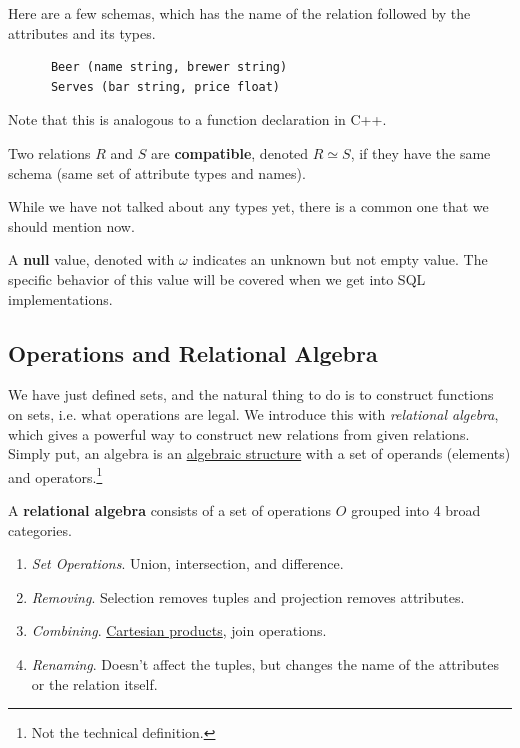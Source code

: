   \begin{example}[Schemas]
    \label{ex:schemas}
    Here are a few schemas, which has the name of the relation followed by the attributes and its types. 
    \begin{lstlisting}
      Beer (name string, brewer string)
      Serves (bar string, price float)
    \end{lstlisting}
    Note that this is analogous to a function declaration in C++. 
  \end{example}  

  \begin{definition}[Compatiblity]
    \label{def:compatiblity}
    Two relations $R$ and $S$ are \textbf{compatible}, denoted $R \simeq S$, if they have the same schema (same set of attribute types and names). 
  \end{definition}

  While we have not talked about any types yet, there is a common one that we should mention now. 

  \begin{definition}[Null]
    \label{def:null}
    A \textbf{null} value, denoted with $\omega$ indicates an unknown but not empty value. The specific behavior of this value will be covered when we get into SQL implementations. 
  \end{definition}

\subsection{Operations and Relational Algebra}

    We have just defined sets, and the natural thing to do is to construct functions on sets, i.e. what operations are legal. We introduce this with \textit{relational algebra}, which gives a powerful way to construct new relations from given relations. Simply put, an algebra is an \hyperref[alg-def:algebraic-structure]{algebraic structure} with a set of operands (elements) and operators.\footnote{Not the technical definition.}

    \begin{definition}
      \label{def:relational-algebra}
 
      A \textbf{relational algebra} consists of a set of operations $O$ grouped into 4 broad categories. 
      \begin{enumerate}
        \item \textit{Set Operations}. Union, intersection, and difference. 
        \item \textit{Removing}. Selection removes tuples and projection removes attributes. 
        \item \textit{Combining}. \hyperref[st-def:cart-prod-2]{Cartesian products}, join operations. 
        \item \textit{Renaming}. Doesn't affect the tuples, but changes the name of the attributes or the relation itself. 
      \end{enumerate}
    \end{definition}

